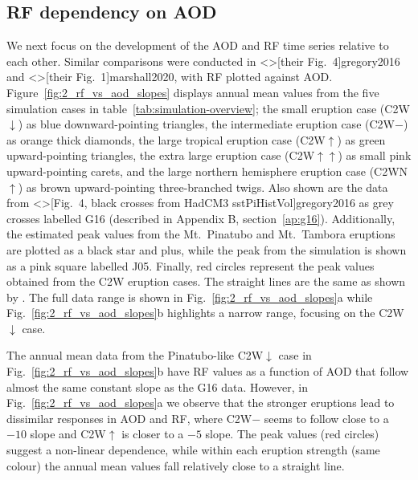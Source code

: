 \documentclass[draft]{agujournal2019}
\begin{document}
\subsection{RF dependency on AOD}

We next focus on the development of the AOD and RF time series relative to each other.
Similar comparisons were conducted in \citeA<>[their Fig.\ 4]{gregory2016} and
\citeA<>[their Fig.\ 1]{marshall2020}, with RF plotted against AOD.
Figure~\ref{fig:2_rf_vs_aod_slopes} displays annual mean values from the five simulation
cases in table~\ref{tab:simulation-overview}; the small eruption case
(C2W\(\downarrow\)) as blue downward-pointing triangles, the intermediate eruption case
(C2W\(-\)) as orange thick diamonds, the large tropical eruption case (C2W\(\uparrow\))
as green upward-pointing triangles, the extra large eruption case
(C2W\(\uparrow\uparrow\)) as small pink upward-pointing carets, and the large northern
hemisphere eruption case (C2WN\(\uparrow\)) as brown upward-pointing three-branched
twigs. Also shown are the data from \citeA<>[Fig.\ 4, black crosses from HadCM3
  sstPiHistVol]{gregory2016} as grey crosses labelled G16 (described in Appendix B,
section~\ref{ap:g16}). Additionally, the estimated peak values from the Mt.\ Pinatubo
and Mt.\ Tambora eruptions are plotted as a black star and plus, while the peak from the
 simulation is shown as a pink square labelled J05. Finally, red
circles represent the peak values obtained from the C2W eruption cases. The straight
lines are the same as shown by . The full data range is shown in
Fig.~\ref{fig:2_rf_vs_aod_slopes}a while Fig.~\ref{fig:2_rf_vs_aod_slopes}b highlights a
narrow range, focusing on the C2W\(\downarrow\) case.

The annual mean data from the Pinatubo-like C2W\(\downarrow\) case in
Fig.~\ref{fig:2_rf_vs_aod_slopes}b have RF values as a function of AOD that follow
almost the same constant slope as the G16 data. However, in
Fig.~\ref{fig:2_rf_vs_aod_slopes}a we observe that the stronger eruptions lead to
dissimilar responses in AOD and RF, where C2W\(-\) seems to follow close to a \(-10\)
slope and C2W\(\uparrow\) is closer to a \(-5\) slope. The peak values (red circles)
suggest a non-linear dependence, while within each eruption strength (same colour) the
annual mean values fall relatively close to a straight line.
\end{document}

